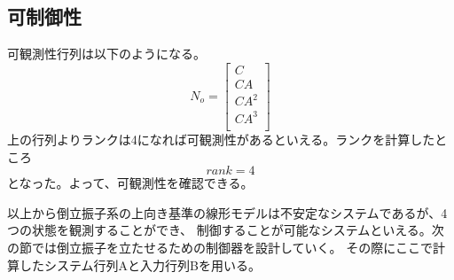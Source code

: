 	\subsection{可制御性}
		可観測性行列は以下のようになる。
		\begin{equation}
			N_{o} = \left[
			\begin{array}{c}
				C\\
				CA\\
				CA^{2}\\
				CA^{3}\\
			\end{array}
			\right]
		\end{equation}
		上の行列よりランクは4になれば可観測性があるといえる。ランクを計算したところ
		\begin{equation}
			rank = 4
		\end{equation}
		となった。よって、可観測性を確認できる。\\
	\par
	以上から倒立振子系の上向き基準の線形モデルは不安定なシステムであるが、4つの状態を観測することができ、
	制御することが可能なシステムといえる。次の節では倒立振子を立たせるための制御器を設計していく。
	その際にここで計算したシステム行列Aと入力行列Bを用いる。
		

